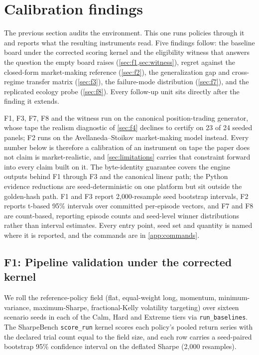 \section{Calibration findings}\label{sec:findings}

The previous section audits the environment. This one runs policies through it and reports what the resulting instruments read. Five findings follow: the baseline board under the corrected scoring kernel and the eligibility witness that answers the question the empty board raises (\cref{sec:f1,sec:witness}), regret against the closed-form market-making reference (\cref{sec:f2}), the generalization gap and cross-regime transfer matrix (\cref{sec:f3}), the failure-mode distribution (\cref{sec:f7}), and the replicated ecology probe (\cref{sec:f8}). Every follow-up unit sits directly after the finding it extends.

F1, F3, F7, F8 and the witness run on the canonical position-trading generator, whose tape the realism diagnostic of \cref{sec:f4} declines to certify on 23 of 24 seeded panels; F2 runs on the Avellaneda--Stoikov market-making model instead. Every number below is therefore a calibration of an instrument on tape the paper does not claim is market-realistic, and \cref{sec:limitations} carries that constraint forward into every claim built on it. The byte-identity guarantee covers the engine outputs behind F1 through F3 and the canonical linear path; the Python evidence reductions are seed-deterministic on one platform but sit outside the golden-hash path. F1 and F3 report 2{,}000-resample seed bootstrap intervals, F2 reports t-based 95\% intervals over committed per-episode vectors, and F7 and F8 are count-based, reporting episode counts and seed-level winner distributions rather than interval estimates. Every entry point, seed set and quantity is named where it is reported, and the commands are in \cref{app:commands}.

\subsection{F1: Pipeline validation under the corrected kernel}\label{sec:f1}

We roll the reference-policy field (flat, equal-weight long, momentum, minimum-variance, maximum-Sharpe, fractional-Kelly volatility targeting) over sixteen scenario seeds in each of the Calm, Hard and Extreme tiers via \texttt{run\_baselines}. The SharpeBench \texttt{score\_run} kernel scores each policy's pooled return series with the declared trial count equal to the field size, and each row carries a seed-paired bootstrap 95\% confidence interval on the deflated Sharpe (2{,}000 resamples).

